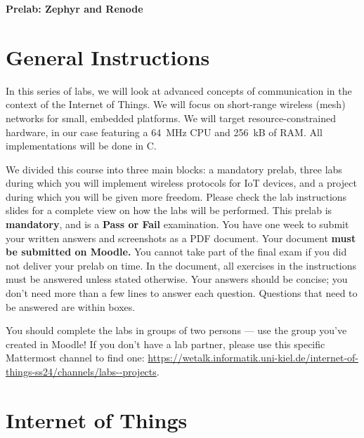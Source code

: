 \documentclass[11pt]{article}
\begin{document}
\begin{center}
{\Large \bf Prelab: Zephyr and Renode }
\end{center}


\section*{General Instructions}

In this series of labs, we will look at advanced concepts of communication in the context of the Internet of Things. 
We will focus on short-range wireless (mesh) networks for small, embedded platforms. 
We will target resource-constrained hardware, in our case featuring a 64~MHz CPU and 256~kB of RAM.
All implementations will be done in C.

We divided this course into three main blocks: a mandatory prelab, three labs during which you will implement wireless protocols for IoT devices, and a project during which you will be given more freedom.
Please check the lab instructions slides for a complete view on how the labs will be performed.
This prelab is \textbf{mandatory}, and is a \textbf{Pass or Fail} examination.
You have one week to submit your written answers and screenshots as a PDF document.
Your document \textbf{must be submitted on Moodle.}
You cannot take part of the final exam if you did not deliver your prelab on time.
In the document, all exercises in the instructions must be answered unless stated otherwise. 
Your answers should be concise; you don't need more than a few lines to answer each question. 
Questions that need to be answered are within boxes. 

You should complete the labs in groups of two persons --- use the group you've created in Moodle!
If you don't have a lab partner, please use this specific Mattermost channel to find one: \url{https://wetalk.informatik.uni-kiel.de/internet-of-things-ss24/channels/labs--projects}.

\section*{Internet of Things}
\end{document}
